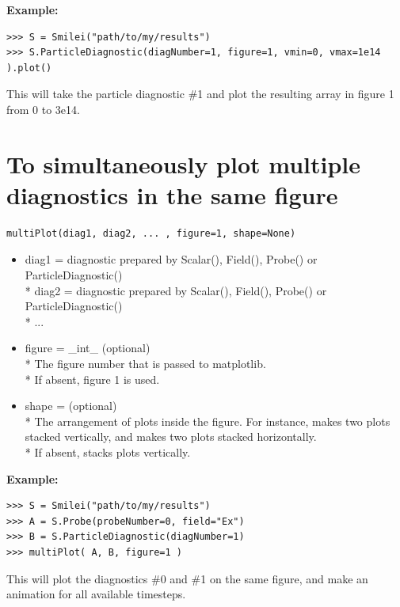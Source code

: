 \documentclass[11pt]{article}
\newcommand{\code}[1]{\colorbox{yellow!15}{\ttfamily #1}}
\begin{document}
\textbf{Example:}
\begin{lstlisting}
>>> S = Smilei("path/to/my/results")
>>> S.ParticleDiagnostic(diagNumber=1, figure=1, vmin=0, vmax=1e14 ).plot()
\end{lstlisting}
This will take the particle diagnostic \#1 and plot the resulting array in figure 1 from 0 to 3e14.
\clearpage


\section{To simultaneously plot multiple diagnostics in the same figure}
\begin{lstlisting}
multiPlot(diag1, diag2, ... , figure=1, shape=None)
\end{lstlisting}

\begin{itemize}
\item \code{diag1} = diagnostic prepared by \code{Scalar()}, \code{Field()}, \code{Probe()} or \code{ParticleDiagnostic()}\\*
	\code{diag2} = diagnostic prepared by \code{Scalar()}, \code{Field()}, \code{Probe()} or \code{ParticleDiagnostic()}\\*
	...

\item \code{figure} = \code{\_int\_}       (optional)\\*
	The figure number that is passed to matplotlib.\\*
	If absent, figure 1 is used.
	
\item \code{shape} = \code{[\_int\_ , \_int\_]}       (optional)\\*
	The arrangement of plots inside the figure. For instance, \code{[2, 1]} makes two plots stacked vertically, and \code{[1, 2]} makes two plots stacked horizontally.\\*
	If absent, stacks plots vertically.
\end{itemize}

\textbf{Example:}
\begin{lstlisting}
>>> S = Smilei("path/to/my/results")
>>> A = S.Probe(probeNumber=0, field="Ex")
>>> B = S.ParticleDiagnostic(diagNumber=1)
>>> multiPlot( A, B, figure=1 )
\end{lstlisting}

This will plot the diagnostics \#0 and \#1 on the same figure, and make an animation for all available timesteps.
\end{document}
